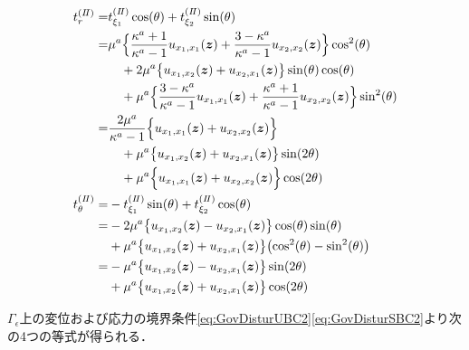 \begin{align}
	t_{r}^{(I\hspace{-.15em}I)}
		=&t_{\xi_1}^{(I\hspace{-.15em}I)}\cos(\theta)+t_{\xi_2}^{(I\hspace{-.15em}I)}\sin(\theta)
			\nonumber
			\\
		=&\mu^a\Bigl\{\frac{\kappa^a+1}{\kappa^a-1} u_{x_{1},x_{1}}(\bm{z})
			+\frac{3-\kappa^a}{\kappa^a-1} u_{x_{2},x_{2}}(\bm{z})\Bigr\}\cos^2(\theta)
			\nonumber
			\\
			&\quad+2\mu^a\bigl\{u_{x_{1},x_{2}}(\bm{z})
			+u_{x_{2},x_{1}}(\bm{z})\bigr\}\sin(\theta)\cos(\theta)
			\nonumber
			\\
			&\quad+\mu^a\Bigl\{ \frac{3-\kappa^a}{\kappa^a-1} u_{x_{1},x_{1}}(\bm{z})
			+\frac{\kappa^a+1}{\kappa^a-1} u_{x_{2},x_{2}}(\bm{z})\Bigr\}\sin^2(\theta)
			\nonumber
			\\
		=&\frac{2\mu^a}{\kappa^a-1}\Bigl\{ u_{x_{1},x_{1}}(\bm{z})
			+ u_{x_{2},x_{2}}(\bm{z})\Bigr\}
			\nonumber
			\\
			&\quad+\mu^a\bigl\{u_{x_{1},x_{2}}(\bm{z})
			+u_{x_{2},x_{1}}(\bm{z})\bigr\}\sin(2\theta)
			\nonumber
			\\
			&\quad+\mu^a\Bigl\{ u_{x_{1},x_{1}}(\bm{z})
			+ u_{x_{2},x_{2}}(\bm{z})\Bigr\}\cos(2\theta)
			\\
	t_{\theta}^{(I\hspace{-.15em}I)}				
		=&-t_{\xi_1}^{(I\hspace{-.15em}I)}\sin(\theta)+t_{\xi_2}^{(I\hspace{-.15em}I)}\cos(\theta)
			\nonumber
			\\
		=&-2\mu^a \bigl\{u_{x_{1},x_{2}}(\bm{z})-u_{x_{2},x_{1}}(\bm{z})\bigr\}\cos(\theta)\sin(\theta)
			\nonumber
			\\
			&+\mu^a \bigl\{u_{x_{1},x_{2}}(\bm{z})+u_{x_{2},x_{1}}(\bm{z})\bigr\}
			\bigl(\cos^2(\theta)-\sin^2(\theta)\bigr)
			\nonumber
			\\
		=&-\mu^a \bigl\{u_{x_{1},x_{2}}(\bm{z})-u_{x_{2},x_{1}}(\bm{z})\bigr\}\sin(2\theta)
			\nonumber
			\\
			&+\mu^a \bigl\{u_{x_{1},x_{2}}(\bm{z})+u_{x_{2},x_{1}}(\bm{z})\bigr\}\cos(2\theta)
\end{align}

$\Gamma_{\epsilon}$上の変位および応力の境界条件\eqref{eq:GovDisturUBC2}\eqref{eq:GovDisturSBC2}より次の4つの等式が得られる．


